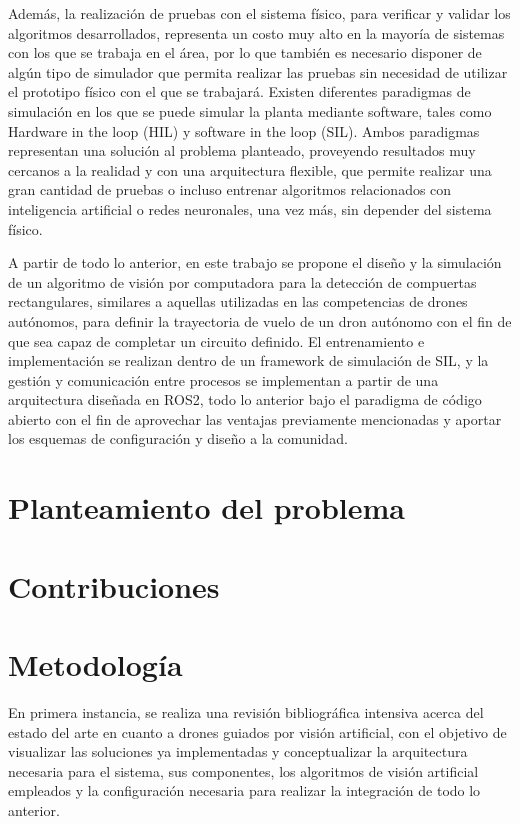 Además, la realización de pruebas con el sistema físico, para verificar y validar los algoritmos desarrollados, representa un costo muy alto en la mayoría de sistemas con los que se trabaja en el área, por lo que también es necesario disponer de algún tipo de simulador que permita realizar las pruebas sin necesidad de utilizar el prototipo físico con el que se trabajará. Existen diferentes paradigmas de simulación en los que se puede simular la planta mediante software, tales como Hardware in the loop (HIL) y software in the loop (SIL). Ambos paradigmas representan una solución al problema planteado, proveyendo resultados muy cercanos a la realidad y con una arquitectura flexible, que permite realizar una gran cantidad de pruebas o incluso entrenar algoritmos relacionados con inteligencia artificial o redes neuronales, una vez más, sin depender del sistema físico. 

A partir de todo lo anterior, en este trabajo se propone el diseño y la simulación de un algoritmo de visión por computadora para la detección de compuertas rectangulares, similares a aquellas utilizadas en las competencias de drones autónomos, para definir la trayectoria de vuelo de un dron autónomo con el fin de que sea capaz de completar un circuito definido.  El entrenamiento e implementación se realizan dentro de un framework de simulación de SIL, y la gestión y comunicación entre procesos se implementan a partir de una arquitectura diseñada en ROS2, todo lo anterior bajo el paradigma de código abierto con el fin de aprovechar las ventajas previamente mencionadas y aportar los esquemas de configuración y diseño a la comunidad.

\vfill

\section{Planteamiento del problema}


 \section{Contribuciones}

 \section{Metodología}
En primera instancia, se realiza una revisión bibliográfica intensiva acerca del estado del arte en cuanto a drones guiados por visión artificial, con el objetivo de visualizar las soluciones ya implementadas y conceptualizar la arquitectura necesaria para el sistema, sus componentes, los algoritmos de visión artificial empleados y la configuración necesaria para realizar la integración de todo lo anterior.


